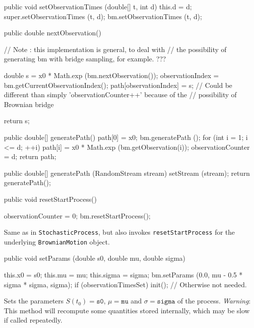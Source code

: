\begin{code}\begin{hide}
   public void setObservationTimes (double[] t, int d) {
        this.d = d;
        super.setObservationTimes (t, d);
        bm.setObservationTimes (t, d);
    }

   public double nextObservation() {
        // Note : this implementation is general, to deal with
        // the possibility of generating bm with bridge sampling, for example.  ???

        double s = x0 * Math.exp (bm.nextObservation());
        observationIndex = bm.getCurrentObservationIndex();
        path[observationIndex] = s;
        // Could be different than simply 'observationCounter++' because of the
        // possibility of Brownian bridge

        return s;
    }

   public double[] generatePath() {
        path[0] = x0;
        bm.generatePath ();
        for (int i = 1; i <= d; ++i)
            path[i] = x0 * Math.exp (bm.getObservation(i));
        observationCounter = d;
        return path;
    }

   public double[] generatePath (RandomStream stream) {
        setStream (stream);
        return generatePath();
    }\end{hide}

   public void resetStartProcess() \begin{hide} {
        observationCounter = 0;
        bm.resetStartProcess();
    }\end{hide}
\end{code}
\begin{tabb} Same as in \texttt{StochasticProcess}, but also invokes 
\texttt{resetStartProcess} for the underlying \texttt{BrownianMotion} object.
\end{tabb}
\begin{code}

   public void setParams (double s0, double mu, double sigma) \begin{hide} { 
        this.x0    = s0;
        this.mu    = mu;
        this.sigma = sigma;
        bm.setParams (0.0, mu - 0.5 * sigma * sigma, sigma);
        if (observationTimesSet) init(); // Otherwise not needed.
    }\end{hide}
\end{code}
\begin{tabb} 
Sets the parameters $S(t_{0}) = \texttt{s0}$, $\mu = \texttt{mu}$ and 
$\sigma = \texttt{sigma}$ of the process. 
\emph{Warning}: This method will recompute some quantities stored internally, 
which may be slow if called repeatedly.
\end{tabb}
